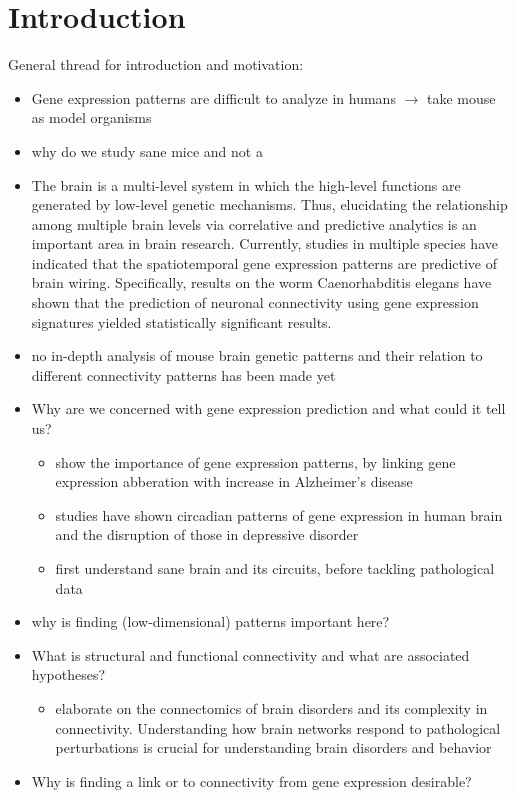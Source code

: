 \documentclass[]{article}
\renewcommand{\cite}{\citep}
\begin{document}
\section{Introduction}
\label{sec:introduction}
General thread for introduction and motivation:
\begin{itemize}
	\item Gene expression patterns are difficult to analyze in humans $\rightarrow$ take mouse as model organisms
	\item why do we study sane mice and not a
	
	\item The brain is a multi-level system in which the high-level functions are generated by low-level genetic mechanisms. Thus, elucidating the relationship among multiple brain levels via correlative and predictive analytics is an important area in brain research. Currently, studies in multiple species have indicated that the spatiotemporal gene expression patterns are predictive of brain wiring. Specifically, results on the worm Caenorhabditis elegans have shown that the prediction of neuronal connectivity using gene expression signatures yielded statistically significant results.
	\item no in-depth analysis of mouse brain genetic patterns and their relation to different connectivity patterns has been made yet

	\item Why are we concerned with gene expression prediction and what could it tell us?
	\begin{itemize}
		\item \cite{twine2011whole} show the importance of gene expression patterns, by linking gene expression abberation with increase in Alzheimer's disease
		\item studies have shown circadian patterns of gene expression in human brain and the disruption of those in depressive disorder \cite{li2013circadian}
		\item first understand sane brain and its circuits, before tackling pathological data
	\end{itemize}
	\item why is finding (low-dimensional) patterns important here?

	\item What is structural and functional connectivity and what are associated hypotheses? 
	\begin{itemize}
		\item \cite{fornito2015connectomics} elaborate on the connectomics of brain disorders and its complexity in connectivity. Understanding how brain networks respond to pathological perturbations is crucial for understanding brain disorders and behavior
	\end{itemize}
	\item Why is finding a link or to connectivity from gene expression desirable?



\end{itemize}
\end{document}
